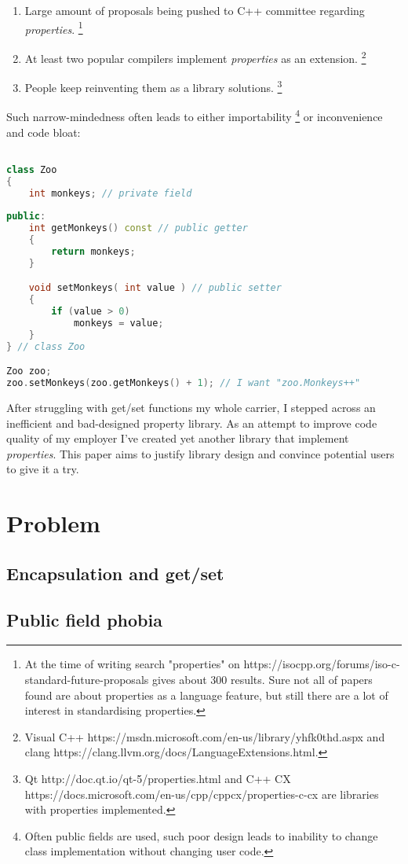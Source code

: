 \documentclass[12pt]{amsart}
\begin{document}
\begin{enumerate}
\item Large amount of proposals being pushed to C++ committee regarding \textit{properties}. \footnote{At the time of writing search "properties" on https://isocpp.org/forums/iso-c-standard-future-proposals gives about 300 results. Sure not all of papers found are about properties as a language feature, but still there are a lot of interest in standardising properties.}
\item At least two popular compilers implement \textit{properties} as an extension. \footnote{Visual C++ https://msdn.microsoft.com/en-us/library/yhfk0thd.aspx and clang https://clang.llvm.org/docs/LanguageExtensions.html.}
\item People keep reinventing them as a library solutions. \footnote{Qt http://doc.qt.io/qt-5/properties.html and C++ CX https://docs.microsoft.com/en-us/cpp/cppcx/properties-c-cx are libraries with properties implemented.}
\end{enumerate}
\bigskip	Such narrow-mindedness often leads to either importability \footnote{Often public fields are used, such poor design leads to inability to change class implementation without changing user code.} or inconvenience and code bloat:
\begin{lstlisting}[language=C++] 

class Zoo 
{
    int monkeys; // private field
    
public:
    int getMonkeys() const // public getter 
    {
        return monkeys;
    }  

    void setMonkeys( int value ) // public setter 
    {
        if (value > 0)
            monkeys = value;
    }  
} // class Zoo 

Zoo zoo;
zoo.setMonkeys(zoo.getMonkeys() + 1); // I want "zoo.Monkeys++"

\end{lstlisting}
	After struggling with get/set functions my whole carrier, I stepped across an inefficient and bad-designed property library. As an attempt to improve code quality of my employer I've created yet another library that implement \textit{properties}. This paper aims to justify library design and convince potential users to give it a try.

\clearpage\section{Problem}
\subsection{Encapsulation and get/set}
\subsection{Public field phobia}

\printbibliography
\end{document}
